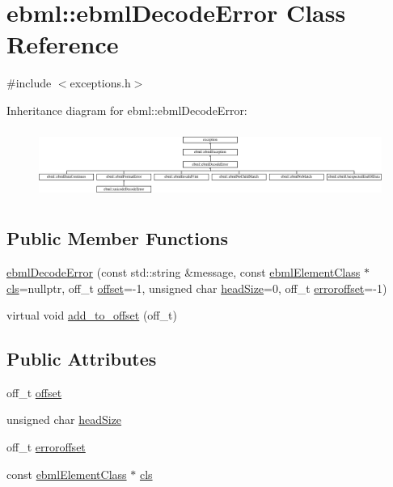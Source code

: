 \hypertarget{classebml_1_1ebmlDecodeError}{}\section{ebml\+:\+:ebml\+Decode\+Error Class Reference}
\label{classebml_1_1ebmlDecodeError}


{\ttfamily \#include $<$exceptions.\+h$>$}

Inheritance diagram for ebml\+:\+:ebml\+Decode\+Error\+:\begin{figure}[H]
\begin{center}
\leavevmode
\includegraphics[height=2.265372cm]{classebml_1_1ebmlDecodeError}
\end{center}
\end{figure}
\subsection*{Public Member Functions}
\begin{DoxyCompactItemize}
\item 
\mbox{\hyperlink{classebml_1_1ebmlDecodeError_a1b644d8b9774ec88685fcedf87cdd74f}{ebml\+Decode\+Error}} (const std\+::string \&message, const \mbox{\hyperlink{classebml_1_1ebmlElementClass}{ebml\+Element\+Class}} $\ast$\mbox{\hyperlink{classebml_1_1ebmlDecodeError_a3568b4ea3cd5bd16b9510abfe269920f}{cls}}=nullptr, off\+\_\+t \mbox{\hyperlink{classebml_1_1ebmlDecodeError_ad32ac9b3dd52f1c11479085d9c665e0f}{offset}}=-\/1, unsigned char \mbox{\hyperlink{classebml_1_1ebmlDecodeError_a61a4d4856f0c779a1c216e45dc5a7c1e}{head\+Size}}=0, off\+\_\+t \mbox{\hyperlink{classebml_1_1ebmlDecodeError_acb525117e0109d9640fb5e8c546e9a02}{erroroffset}}=-\/1)
\item 
virtual void \mbox{\hyperlink{classebml_1_1ebmlDecodeError_a2ff987918cff7b3495e2f9583087518d}{add\+\_\+to\+\_\+offset}} (off\+\_\+t)
\end{DoxyCompactItemize}
\subsection*{Public Attributes}
\begin{DoxyCompactItemize}
\item 
off\+\_\+t \mbox{\hyperlink{classebml_1_1ebmlDecodeError_ad32ac9b3dd52f1c11479085d9c665e0f}{offset}}
\item 
unsigned char \mbox{\hyperlink{classebml_1_1ebmlDecodeError_a61a4d4856f0c779a1c216e45dc5a7c1e}{head\+Size}}
\item 
off\+\_\+t \mbox{\hyperlink{classebml_1_1ebmlDecodeError_acb525117e0109d9640fb5e8c546e9a02}{erroroffset}}
\item 
const \mbox{\hyperlink{classebml_1_1ebmlElementClass}{ebml\+Element\+Class}} $\ast$ \mbox{\hyperlink{classebml_1_1ebmlDecodeError_a3568b4ea3cd5bd16b9510abfe269920f}{cls}}
\end{DoxyCompactItemize}


